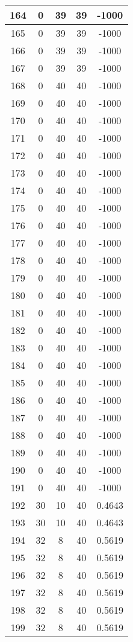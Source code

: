\documentclass[letterpaper, 12pt]{article}
\begin{document}
\begin{longtable}{|c|c|c|c|c|}
164 & 0 & 39 & 39 & -1000 \\
\hline
165 & 0 & 39 & 39 & -1000 \\
\hline
166 & 0 & 39 & 39 & -1000 \\
\hline
167 & 0 & 39 & 39 & -1000 \\
\hline
168 & 0 & 40 & 40 & -1000 \\
\hline
169 & 0 & 40 & 40 & -1000 \\
\hline
170 & 0 & 40 & 40 & -1000 \\
\hline
171 & 0 & 40 & 40 & -1000 \\
\hline
172 & 0 & 40 & 40 & -1000 \\
\hline
173 & 0 & 40 & 40 & -1000 \\
\hline
174 & 0 & 40 & 40 & -1000 \\
\hline
175 & 0 & 40 & 40 & -1000 \\
\hline
176 & 0 & 40 & 40 & -1000 \\
\hline
177 & 0 & 40 & 40 & -1000 \\
\hline
178 & 0 & 40 & 40 & -1000 \\
\hline
179 & 0 & 40 & 40 & -1000 \\
\hline
180 & 0 & 40 & 40 & -1000 \\
\hline
181 & 0 & 40 & 40 & -1000 \\
\hline
182 & 0 & 40 & 40 & -1000 \\
\hline
183 & 0 & 40 & 40 & -1000 \\
\hline
184 & 0 & 40 & 40 & -1000 \\
\hline
185 & 0 & 40 & 40 & -1000 \\
\hline
186 & 0 & 40 & 40 & -1000 \\
\hline
187 & 0 & 40 & 40 & -1000 \\
\hline
188 & 0 & 40 & 40 & -1000 \\
\hline
189 & 0 & 40 & 40 & -1000 \\
\hline
190 & 0 & 40 & 40 & -1000 \\
\hline
191 & 0 & 40 & 40 & -1000 \\
\hline
192 & 30 & 10 & 40 & 0.4643 \\
\hline
193 & 30 & 10 & 40 & 0.4643 \\
\hline
194 & 32 & 8 & 40 & 0.5619 \\
\hline
195 & 32 & 8 & 40 & 0.5619 \\
\hline
196 & 32 & 8 & 40 & 0.5619 \\
\hline
197 & 32 & 8 & 40 & 0.5619 \\
\hline
198 & 32 & 8 & 40 & 0.5619 \\
\hline
199 & 32 & 8 & 40 & 0.5619 \\
\hline
\end{longtable}
\end{document}
